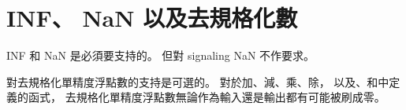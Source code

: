 \section{INF、 NaN 以及去規格化數}

INF 和 NaN 是必須要支持的。
但對 signaling NaN 不作要求。

對去規格化單精度浮點數的支持是可選的。
對於加、減、乘、除，
以及、和中定義的函式，
去規格化單精度浮點數無論作為輸入還是輸出都有可能被刷成零。

